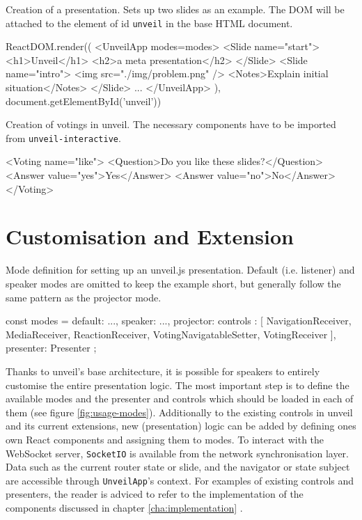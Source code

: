 \begin{program}
\caption{Creation of a presentation. Sets up two slides as an example. The DOM will be attached to the element of id \texttt{unveil} in the base HTML document.}
\label{prog:usage-presentation-creation}
\begin{JsCode}
ReactDOM.render((
  <UnveilApp modes={modes}>
    <Slide name="start">
      <h1>Unveil</h1>
      <h2>a meta presentation</h2>
    </Slide>
    <Slide name="intro">
      <img src="./img/problem.png" />
      <Notes>Explain initial situation</Notes>
    </Slide>
    ...
  </UnveilApp>
), document.getElementById('unveil'))
\end{JsCode}
\end{program}


\begin{program}
\caption{Creation of votings in unveil. The necessary components have to be imported from \texttt{unveil-interactive}.}
\label{prog:usage-voting}
\begin{JsCode}
<Voting name="like">
  <Question>Do you like these slides?</Question>
  <Answer value="yes">Yes</Answer>
  <Answer value="no">No</Answer>
</Voting>
\end{JsCode}
\end{program}

\section{Customisation and Extension}
\label{sec:usage-customisation}

\begin{program}
\caption{Mode definition for setting up an unveil.js presentation. Default (i.e. listener) and speaker modes are omitted to keep the example short, but generally follow the same pattern as the projector mode.}
\label{fig:usage-modes}
\begin{JsCode}
const modes = {
  default: {...},
  speaker: {...},
  projector: {
    controls : [
      NavigationReceiver, MediaReceiver, ReactionReceiver,
      VotingNavigatableSetter, VotingReceiver
    ],
    presenter: Presenter
  }
};
\end{JsCode}
\end{program}

Thanks to unveil's base architecture, it is possible for speakers to entirely customise the entire presentation logic. The most important step is to define the available modes and the presenter and controls which should be loaded in each of them (see figure \ref{fig:usage-modes}). Additionally to the existing controls in unveil and its current extensions, new (presentation) logic can be added by defining ones own React components and assigning them to modes. To interact with the WebSocket server, \texttt{SocketIO} is available from the network synchronisation layer. Data such as the current router state or slide, and the navigator or state subject are accessible through \texttt{UnveilApp}'s context. For examples of existing controls and presenters, the reader is adviced to refer to the implementation of the components discussed in chapter \ref{cha:implementation} \cite{unveil-fork, unveil-network-sync, unveil-interactive}.


